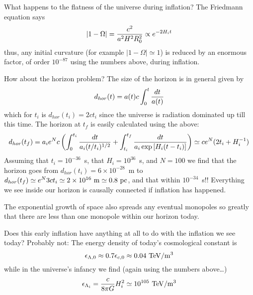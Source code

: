 \documentclass{article}
\begin{document}
\par
What happens to the flatness of the universe during inflation? The Friedmann equation says
\[ |1-\Omega|={c^2\over a^2H^2R_0^2}\propto e^{-2H_it} \]
thus, any initial curvature (for example $|1-\Omega|\simeq 1$) is reduced by an enormous factor, of order $10^{-87}$ using the numbers above,
during inflation.
\par 
How about the horizon problem? The size of the horizon is in general given by 
\[ d_{hor}(t)=a(t)c\int_0^t{dt\over a(t)} \] 
which for $t_i$ is $d_{hor}(t_i)=2ct_i$ since the universe is radiation dominated
up till this time. The horizon at $t_f$ is easily calculated using the above:
\[ d_{hor}(t_f)=a_ie^Nc\left(\int_0^{t_i}{dt\over a_i(t/t_i)^{1/2}}+\int_{t_i}^{t_f}{dt\over a_i\exp\left[ H_i(t-t_i)\right]}\right) \simeq ce^N(2t_i+H_i^{-1}) \]
Assuming that $t_i=10^{-36}$~s, that $H_i=10^{36}$~s, and $N=100$ we find that the horizon goes from $d_{hor}(t_i)=6\times 10^{-28}$~m to
$d_{hor}(t_f)\simeq e^N3ct_i\simeq 2\times 10^{16}~{\rm m}\simeq 0.8~{\rm pc}$, and that within $10^{-34}$~s!! Everything we see inside
our horizon is causally connected if inflation has happened.
\par
The exponential growth of space also spreads any eventual monopoles so greatly that there are less than one monopole within our horizon today.
\par
Does this early inflation have anything at all to do with the inflation we see today? Probably not: The energy density of today's
cosmological constant is 
\[ \epsilon_{\Lambda,0}\approx 0.7\epsilon_{c,0}\approx 0.04~{\rm TeV/m^3} \]
while in the universe's infancy we find (again using the numbers above\ldots)
\[ \epsilon_{\Lambda_i}={c\over 8\pi G}H_i^2\simeq 10^{105}~{\rm TeV/m^3} \]
\end{document}
